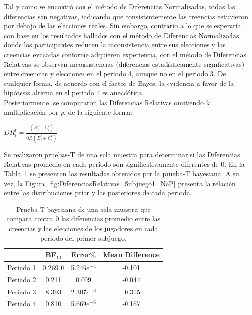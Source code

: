 Tal y como se encontró con el método de Diferencias Normalizadas, todas las diferencias son negativas, indicando que consistentemente las creencias estuvieron por debajo de las elecciones reales. Sin embargo, contrario a lo que se esperaría con base en los resultados hallados con el método de Diferencias Normalizadas donde los participantes reducen la inconsistencia entre sus elecciones y las creencias evocadas conforme adquieren experiencia, con el método de Diferencias Relativas se observan inconsistencias (diferencias estadísticamente significativas) entre creencias y elecciones en el periodo 4, aunque no en el periodo 3. De cualquier forma, de acuerdo con el factor de Bayes, la evidencia a favor de la hipótesis alterna en el periodo 4 es anecdótica.\\

Posteriormente, se computaron las Diferencias Relativas omitiendo la multiplicación por $p$, de la siguiente forma:\\

\begin{center}
$DR_i^t = \frac{(B_i^t - C_i^t)}{0.5(B_i^t + C_i^t)}$\\
\end{center}

Se realizaron pruebas-T de una sola muestra para determinar si las Diferencias Relativas promedio en cada periodo son significativamente diferentes de 0. En la Tabla~\ref{DR_Sub1_NoP} se presentan los resultados obtenidos por la prueba-T bayesiana. A su vez, la Figura~\ref{fig:DiferenciasRelativas_Subjuego1_NoP} presenta la relación entre las distribuciones prior y las posteriores de cada periodo.\\


\begin{table}
\caption[Diferencias Relativas en el Subjuego 1 (sin multiplicar por $p$)]{Prueba-T bayesiana de una sola muestra que compara contra 0 las diferencias promedio entre las creencias y las elecciones de los jugadores en cada periodo del primer subjuego.}
\label{DR_Sub1_NoP}
\centering
\begin{tabular}{l | c c c}  %
\toprule
\textbf{} & \textbf{BF$_{10}$} & \textbf{Error$\%$} & \textbf{Mean Difference}\\
\midrule
Periodo 1 & 0.269 0& 5.246$e^{-4}$ & -0.101 \\
Periodo 2 & 0.211 & 0.009 & -0.044 \\
Periodo 3 & 8.393 & 2.307$e^{-6}$ & -0.315 \\
Periodo 4 & 0.810 & 5.669$e^{-6}$ & -0.167 \\
\bottomrule
\end{tabular}
\end{table}

